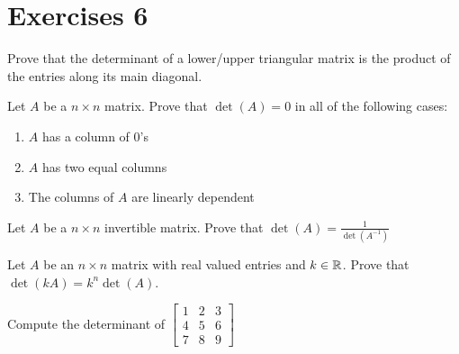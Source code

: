 \section{Exercises 6}
\begin{exercise}
    Prove that the determinant of a lower/upper triangular matrix is the product of the entries along its main diagonal.
\end{exercise}
\begin{exercise}
    Let $A$ be a $n\times n$ matrix. Prove that $\det(A)=0$ in all of the following cases:
    \begin{enumerate}
        \item $A$ has a column of $0$'s
        \item $A$ has two equal columns
        \item The columns of $A$ are linearly dependent
    \end{enumerate}
\end{exercise}
\begin{exercise}
    Let $A$ be a $n\times n$ invertible matrix. Prove that $\det(A)=\frac{1}{\det(A^{-1})}$
\end{exercise}
\begin{exercise}
    Let $A$ be an $n\times n$ matrix with real valued entries and $k\in\mathbb{R}$. Prove that $\det(kA)=k^n\det(A)$.
\end{exercise}
\begin{exercise}
    Compute the determinant of
    $\begin{bmatrix}
        1 & 2 & 3\\
        4 & 5 & 6\\
        7 & 8 & 9
    \end{bmatrix}$
\end{exercise}